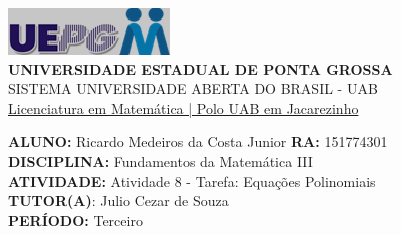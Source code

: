\documentclass[a4paper, 12pt]{article}
\begin{document}
\begin{flushleft}\includegraphics{logo}\\
\textbf{UNIVERSIDADE ESTADUAL DE PONTA GROSSA} \\
SISTEMA UNIVERSIDADE ABERTA DO BRASIL - UAB \\
\underline{Licenciatura em Matemática | Polo UAB em Jacarezinho}\end{flushleft} 
\textbf{ALUNO:} Ricardo Medeiros da Costa Junior   \textbf{RA:} 151774301 \\
\textbf{DISCIPLINA:} Fundamentos da Matemática III \\
\textbf{ATIVIDADE:} Atividade 8 - Tarefa: Equações Polinomiais\\
\textbf{TUTOR(A)}: Julio Cezar de Souza\\
\textbf{PERÍODO:} Terceiro\\
\end{document}
